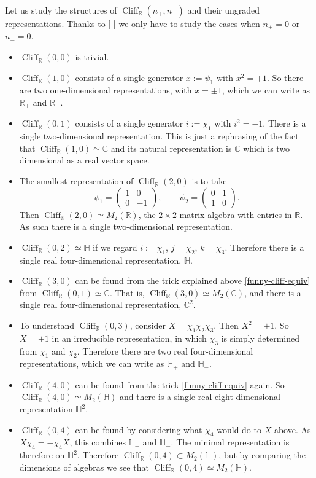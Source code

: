 \documentclass[12pt]{article}
\numberwithin{equation}{section}
\numberwithin{figure}{section}
\theoremstyle{remark}
\def\bC{\mathbb{C}}
\def\bH{\mathbb{H}}
\def\bR{\mathbb{R}}
\def\Cliff{\mathop{\mathrm{Cliff}}\nolimits}
\begin{document}
Let us study the structures of $\Cliff_\bR(n_+,n_-)$ and their ungraded representations.
Thanks to \eqref{-} we only have to study the cases when $n_+=0$ or $n_-=0$.
\begin{itemize}
\item 
$\Cliff_\bR(0,0)$ is trivial.
\item 
$\Cliff_\bR(1,0)$ consists of a single generator  $x:=\psi_1$ with $x^2=+1$.
So there are two one-dimensional representations, with $x=\pm1$,
which we can write as $\bR_+$ and $\bR_-$.
\item 
$\Cliff_\bR(0,1)$ consists of a single generator  $i:=\chi_1$ with $i^2=-1$.
There is a single two-dimensional representation.
This is just a rephrasing of the fact that  $\Cliff_\bR(1,0)\simeq \bC$ and 
its natural representation is $\bC$ which is two dimensional as a real vector space.
\item The smallest representation of $\Cliff_\bR(2,0)$  is to take \begin{equation}
\psi_1 = \begin{pmatrix}
1 & 0 \\
0 & -1
\end{pmatrix} ,\qquad 
\psi_2 = \begin{pmatrix}
0 & 1 \\
1 & 0
\end{pmatrix}.
\end{equation}
Then $\Cliff_\bR(2,0)\simeq M_2(\bR)$, the $2\times 2$ matrix algebra with entries in $\bR$.
As such there is a single two-dimensional representation.
\item
$\Cliff_\bR(0,2)\simeq \bH$ if we regard $i:=\chi_1$, $j=\chi_2$, $k=\chi_3$.
Therefore there is a single real four-dimensional representation, $\bH$.
\item
$\Cliff_\bR(3,0)$  can be found from the trick explained above \eqref{funny-cliff-equiv} 
from $\Cliff_\bR(0,1)\simeq \bC$. 
That is, $\Cliff_\bR(3,0)\simeq M_2(\bC)$,
and there is a single real four-dimensional representation, $\bC^2$. 
\item 
To understand $\Cliff_\bR(0,3)$, consider $X=\chi_1\chi_2\chi_3$. 
Then $X^2=+1$. So $X=\pm 1$ in an irreducible representation,
in which $\chi_3$  is simply determined from $\chi_1$ and $\chi_2$.
Therefore there are two real four-dimensional representations,
which we can write as $\bH_+$ and $\bH_-$.
\item 
$\Cliff_\bR(4,0)$ can be found from the trick \eqref{funny-cliff-equiv} again.
So $\Cliff_\bR(4,0)\simeq M_2(\bH)$
and there is a single real eight-dimensional representation $\bH^2$.
\item
$\Cliff_\bR(0,4)$ can be found by considering what $\chi_4$ would do to $X$ above.
As $X\chi_4=-\chi_4X$, this combines $\bH_+$ and $\bH_-$.
The minimal representation is therefore on $\bH^2$.
Therefore $\Cliff_\bR(0,4)\subset M_2(\bH)$, but by comparing the dimensions of algebras we see that 
$\Cliff_\bR(0,4)\simeq M_2(\bH)$.
\end{itemize}
\end{document}
